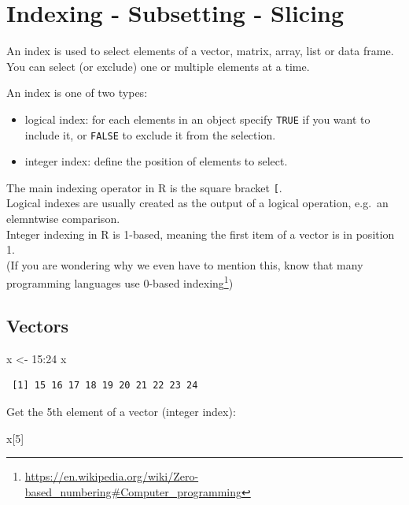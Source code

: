 \documentclass[
]{book}
\newenvironment{Shaded}{\begin{snugshade}}{\end{snugshade}}
\newcommand{\DecValTok}[1]{\textcolor[rgb]{0.00,0.00,0.81}{#1}}
\newcommand{\NormalTok}[1]{#1}
\newcommand{\OtherTok}[1]{\textcolor[rgb]{0.56,0.35,0.01}{#1}}
\newcommand{\SpecialCharTok}[1]{\textcolor[rgb]{0.00,0.00,0.00}{#1}}
\DeclareRobustCommand{\href}[2]{#2\footnote{\url{#1}}}
\providecommand{\tightlist}{%
  \setlength{\itemsep}{0pt}\setlength{\parskip}{0pt}}
\renewcommand{\href}[2]{#2\footnote{\url{#1}}}
\begin{document}
\hypertarget{indexing}{%
\chapter{Indexing - Subsetting - Slicing}\label{indexing}}

An index is used to select elements of a vector, matrix, array, list or data frame.\\
You can select (or exclude) one or multiple elements at a time.

An index is one of two types:

\begin{itemize}
\tightlist
\item
  logical index: for each elements in an object specify \texttt{TRUE} if you want to include it, or \texttt{FALSE} to exclude it from the selection.
\item
  integer index: define the position of elements to select.
\end{itemize}

The main indexing operator in R is the square bracket \texttt{{[}}.\\
Logical indexes are usually created as the output of a logical operation, e.g.~an elemntwise comparison.\\
Integer indexing in R is 1-based, meaning the first item of a vector is in position 1.\\
(If you are wondering why we even have to mention this, know that many programming languages use \href{https://en.wikipedia.org/wiki/Zero-based_numbering\#Computer_programming}{0-based indexing})

\hypertarget{indexvectors}{%
\section{Vectors}\label{indexvectors}}

\begin{Shaded}
\begin{Highlighting}[]
\NormalTok{x }\OtherTok{\textless{}{-}} \DecValTok{15}\SpecialCharTok{:}\DecValTok{24}
\NormalTok{x}
\end{Highlighting}
\end{Shaded}

\begin{verbatim}
 [1] 15 16 17 18 19 20 21 22 23 24
\end{verbatim}

Get the 5th element of a vector (integer index):

\begin{Shaded}
\begin{Highlighting}[]
\NormalTok{x[}\DecValTok{5}\NormalTok{]}
\end{Highlighting}
\end{Shaded}
\end{document}
